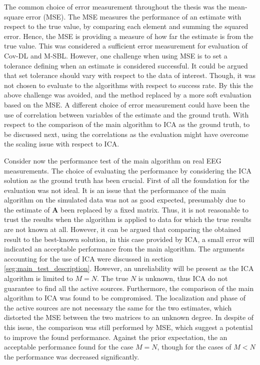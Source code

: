 The common choice of error measurement throughout the thesis was the mean-square error (MSE). 
The MSE measures the performance of an estimate with respect to the true value, by comparing each element and summing the squared error. 
Hence, the MSE is providing a measure of how far the estimate is from the true value. 
This was considered a sufficient error measurement for evaluation of Cov-DL and M-SBL.
However, one challenge when using MSE is to set a tolerance defining when an estimate is considered successful. 
It could be argued that set tolerance should vary with respect to the data of interest.
Though, it was not chosen to evaluate to the algorithms with respect to success rate. By this the above challenge was avoided, and the method replaced by a more soft evaluation based on the MSE. 
A different choice of error measurement could have been the use of correlation between variables of the estimate and the ground truth. With respect to the comparison of the main algorithm to ICA as the ground truth, to be discussed next, using the correlations as the evaluation might have overcome the scaling issue with respect to ICA.    

Consider now the performance test of the main algorithm on real EEG measurements. 
The choice of evaluating the performance by considering the ICA solution as the ground truth has been crucial. 
First of all the foundation for the evaluation was not ideal. 
It is an issue that the performance of the main algorithm on the simulated data was not as good expected, presumably due to the estimate of $\mathbf{A}$ been replaced by a fixed matrix. 
Thus, it is not reasonable to trust the results when the algorithm is applied to data for which the true results are not known at all. 
However, it can be argued that comparing the obtained result to the best-known solution, in this case provided by ICA, a small error will indicated an acceptable performance from the main algorithm. 
The arguments accounting for the use of ICA were discussed in section \ref{seg:main_test_description}. 
However, an unreliability will be present as the ICA algorithm is limited to $M = N$. 
The true $N$ is unknown, thus ICA do not guarantee to find all the active sources.
Furthermore, the comparison of the main algorithm to ICA was found to be compromised. 
The localization and phase of the active sources are not necessary the same for the two estimates, which distorted the MSE between the two matrices to an unknown degree.
In despite of this issue, the comparison was still performed by MSE, which suggest a potential to improve the found performance. 
Against the prior expectation, the an acceptable performance found for the case $M=N$, though for the cases of $M < N$ the performance was decreased significantly.    

